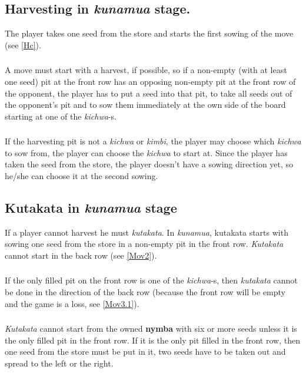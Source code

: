 \documentclass[12pt,a4paper]{article}
\begin{document}
\subsection{\bf Harvesting in {\it kunamua} stage.}\label{Hikuns} 
The player takes one seed from the store and starts the first sowing of the move (see \ref{Hc}).

\subsubsection{}\label{Hikuns1} 
A move must start with a harvest, if possible, so if a non-empty (with at least one seed) pit at the front row has an opposing non-empty pit at the front row of the opponent, the player has to put a seed into that pit, to take all seeds out of the opponent's pit and to sow them immediately at the own side of the board starting at one of the {\it kichwa}-s.
\subsubsection{}\label{Hikuns2}
If the harvesting pit is not a  {\it kichwa} or {\it kimbi}, the player may choose which {\it kichwa} to sow from, the player can choose the {\it kichwa} to start at.  Since the player has taken the seed from the store, the player doesn't have a sowing direction yet, so he/she can choose it at the second sowing.

\subsection{\bf Kutakata in {\it kunamua} stage}\label{Kikuns} 
If a player cannot harvest he must {\it kutakata}.  In {\it kunamua}, kutakata starts with sowing one seed from the store in a non-empty pit in the front row. {\it Kutakata} cannot start in the back row (see \ref{Mov2}).

\subsubsection{}\label{Kikuns1} 
If the only filled pit on the front row is one of the  {\it kichwa}-s, then {\it kutakata} cannot be done in the direction of the back row (because the front row will be empty and the game is a loss, see \ref{Mov3.1}).

\subsubsection{}\label{Kikuns2} 
{\it Kutakata} cannot start from the owned {\bf nymba} with six or more seeds unless it is the only filled pit in the front row. If it is the only pit filled in the front row, then one seed from the store must be put in it, two seeds have to be taken out and spread to the left or the right.
\end{document}
